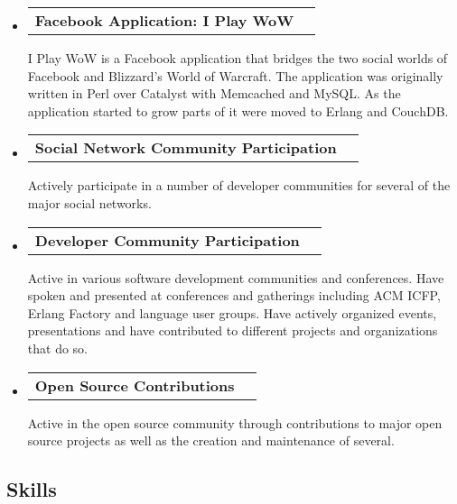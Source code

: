 \documentclass[10pt,letterpaper]{article}
\makeatletter
\newcommand{\headerrow}[2]
{\begin{tabular*}{\linewidth}{l@{\extracolsep{\fill}}r}
  #1 &
  #2 \\
\end{tabular*}}
\makeatother
\begin{document}
\begin{itemize}
  \parskip=0.1em

  \item
  \headerrow
    {\textbf{Facebook Application: I Play WoW}}
    {\textbf{}}
    I Play WoW is a Facebook application that bridges the two social worlds of Facebook and Blizzard's World of Warcraft. The application was originally written in Perl over Catalyst with Memcached and MySQL. As the application started to grow parts of it were moved to Erlang and CouchDB.
  \item
  \headerrow
    {\textbf{Social Network Community Participation}}
    {\textbf{}}
    Actively participate in a number of developer communities for several of the major social networks.
  \item
  \headerrow
    {\textbf{Developer Community Participation}}
    {\textbf{}}
    Active in various software development communities and conferences. Have spoken and presented at conferences and gatherings including ACM ICFP, Erlang Factory and language user groups. Have actively organized events, presentations and have contributed to different projects and organizations that do so.
  \item
  \headerrow
    {\textbf{Open Source Contributions}}
    {\textbf{}}
    Active in the open source community through contributions to major open source projects as well as the creation and maintenance of several.
\end{itemize}

\vspace{-0.4em}
\subsection*{Skills}
\end{document}
